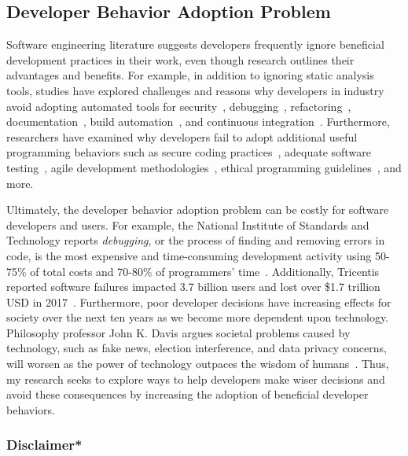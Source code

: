 \subsection{Developer Behavior Adoption Problem}

Software engineering literature suggests developers frequently ignore beneficial development practices in their work, even though research outlines their advantages and benefits. For example, in addition to ignoring static analysis tools, studies have explored challenges and reasons why developers in industry avoid adopting automated tools for security~\cite{Xiao2014Security}, debugging~\cite{Cao2010Debugging}, refactoring~\cite{Murphy-HillBarriersRefactoring}, documentation~\cite{Forward2002Documentation}, build automation~\cite{Akond2017BuildTools}, and continuous integration~\cite{hilton2017CI}. Furthermore, researchers have examined why developers fail to adopt additional useful programming behaviors such as secure coding practices~\cite{Meng18Secure}, adequate software testing~\cite{Whittaker00Testing}, agile development methodologies~\cite{nerur2005agile}, ethical programming guidelines~\cite{McNamaraSmithE2018ACM}, and more. 

Ultimately, the developer behavior adoption problem can be costly for software developers and users. For example, the National Institute of Standards and Technology reports \textit{debugging}, or the process of finding and removing errors in code, is the most expensive and time-consuming development activity using 50-75\% of total costs and 70-80\% of programmers' time~\cite{NIST}. Additionally, Tricentis reported software failures impacted 3.7 billion users and lost over \$1.7 trillion USD in 2017~\cite{SoftwareFailWatch}. Furthermore, poor developer decisions have increasing effects for society over the next ten years as we become more dependent upon technology. Philosophy professor John K. Davis argues societal problems caused by technology, such as fake news, election interference, and data privacy concerns, will worsen as the power of technology outpaces the wisdom of humans~\cite{Davis20Wisdom}. Thus, my research seeks to explore ways to help developers make wiser decisions and avoid these consequences by increasing the adoption of beneficial developer behaviors.

\subsubsection*{Disclaimer*}

